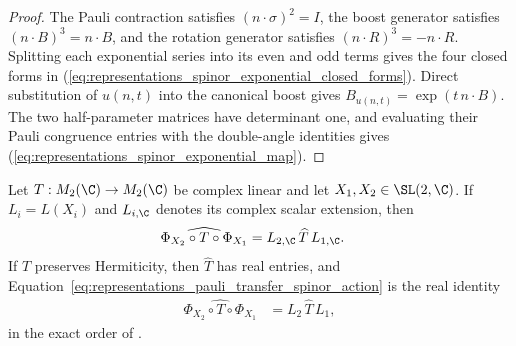 \begin{proof}\leanok
    The Pauli contraction satisfies $(n\cdot\sigma)^2=I$, the boost generator
    satisfies $(n\cdot B)^3=n\cdot B$, and the rotation generator satisfies
    $(n\cdot R)^3=-n\cdot R$.  Splitting each exponential series into its even
    and odd terms gives the four closed forms in
    (\ref{eq:representations_spinor_exponential_closed_forms}).  Direct
    substitution of $u(n,t)$ into the canonical boost gives
    $B_{u(n,t)}=\exp(t\,n\cdot B)$.  The two half-parameter matrices have
    determinant one, and evaluating their Pauli congruence entries with the
    double-angle identities gives
    (\ref{eq:representations_spinor_exponential_map}).
\end{proof}

\begin{theorem}
    \label{thm:pauli_transfer_two_sided_filtering}
    \leanok
    Let $T:M_2(\C)\to M_2(\C)$ be complex linear and let
    $X_1,X_2\in\SL(2,\C)$. If $L_i=L(X_i)$ and $L_{i,\C}$ denotes its
    complex scalar extension, then
    \begin{align}
        \widehat{\Phi_{X_2}\circ T\circ\Phi_{X_1}}
        &=L_{2,\C}\,\widehat T\,L_{1,\C}.
        \label{eq:representations_pauli_transfer_spinor_action}
    \end{align}
    If $T$ preserves Hermiticity, then $\widehat T$ has real entries, and
    Equation~\ref{eq:representations_pauli_transfer_spinor_action} is the real
    identity
    \begin{align}
        \widehat{\Phi_{X_2}\circ T\circ\Phi_{X_1}}
        &=L_2\,\widehat T\,L_1,
        \label{eq:representations_pauli_transfer_spinor_action_real}
    \end{align}
    in the exact order of \cite[Eq.~(2.43)]{Wolf2012Quantum}.
\end{theorem}

